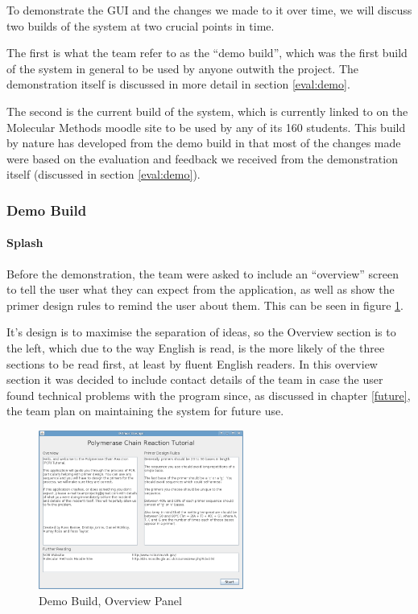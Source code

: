 To demonstrate the GUI and the changes we made to it over time, we
will discuss two builds of the system at two crucial points in time.

The first is what the team refer to as the ``demo build'', which was
the first build of the system in general to be used by anyone outwith
the project.
The demonstration itself is discussed in more detail in section
\ref{eval:demo}.

The second is the current build of the system, which is currently
linked to on the Molecular Methods moodle site to be used by any of
its 160 students.
This build by nature has developed from the demo build in that most of
the changes made were based on the evaluation and feedback we received
from the demonstration itself (discussed in section \ref{eval:demo}).

\subsubsection{Demo Build}

\paragraph{Splash}

Before the demonstration, the team were asked to include an
``overview'' screen to tell the user what they can expect from the
application, as well as show the primer design rules to remind the
user about them.
This can be seen in figure \ref{fig:demoBuild:splash}.

It's design is to maximise the separation of ideas, so the Overview
section is to the left, which due to the way English is read, is the
more likely of the three sections to be read first, at least by fluent
English readers.
In this overview section it was decided to include contact details
of the team in case the user found technical problems with the
program since, as discussed in chapter \ref{future}, the
team plan on maintaining the system for future use.

\begin{figure}[h]
  \begin{center}
    \includegraphics[width=0.6\textwidth]{./images/demoBuild/splash.png}
    \caption{
      \label{fig:demoBuild:splash}
      Demo Build, Overview Panel 
    }
  \end{center}
\end{figure}

